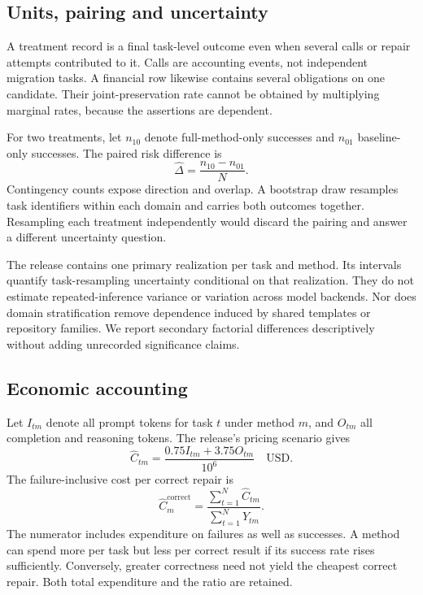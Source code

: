 \subsection{Units, pairing and uncertainty}
A treatment record is a final task-level outcome even when several calls or repair attempts contributed to it. Calls are accounting events, not independent migration tasks. A financial row likewise contains several obligations on one candidate. Their joint-preservation rate cannot be obtained by multiplying marginal rates, because the assertions are dependent.

For two treatments, let $n_{10}$ denote full-method-only successes and $n_{01}$ baseline-only successes. The paired risk difference is
\begin{equation}
\widehat\Delta=\frac{n_{10}-n_{01}}{N}.
\label{eq:paired}
\end{equation}
Contingency counts expose direction and overlap. A bootstrap draw resamples task identifiers within each domain and carries both outcomes together. Resampling each treatment independently would discard the pairing and answer a different uncertainty question.

The release contains one primary realization per task and method. Its intervals quantify task-resampling uncertainty conditional on that realization. They do not estimate repeated-inference variance or variation across model backends. Nor does domain stratification remove dependence induced by shared templates or repository families. We report secondary factorial differences descriptively without adding unrecorded significance claims.

\subsection{Economic accounting}
Let $I_{tm}$ denote all prompt tokens for task $t$ under method $m$, and $O_{tm}$ all completion and reasoning tokens. The release's pricing scenario gives
\begin{equation}
\widehat C_{tm}=\frac{0.75I_{tm}+3.75O_{tm}}{10^6}\quad\mathrm{USD}.
\label{eq:cost}
\end{equation}
The failure-inclusive cost per correct repair is
\begin{equation}
\widehat C_m^{\mathrm{correct}}=\frac{\sum_{t=1}^{N}\widehat C_{tm}}{\sum_{t=1}^{N}Y_{tm}}.
\label{eq:costcorrect}
\end{equation}
The numerator includes expenditure on failures as well as successes. A method can spend more per task but less per correct result if its success rate rises sufficiently. Conversely, greater correctness need not yield the cheapest correct repair. Both total expenditure and the ratio are retained.

